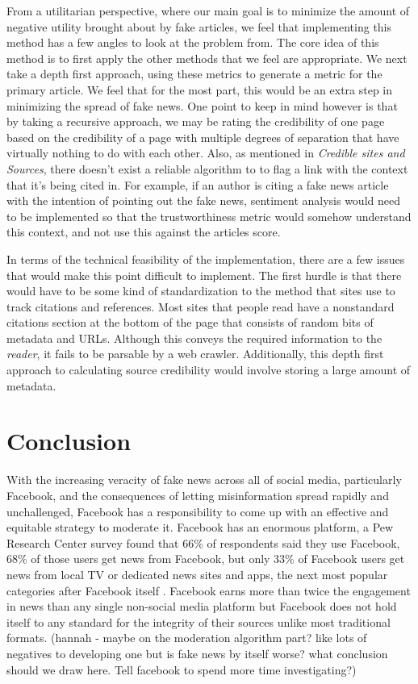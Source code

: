\documentclass[12pt]{article}
\begin{document}
From a utilitarian perspective, where our main goal is to minimize the amount of negative utility brought about by fake articles, we feel that implementing this method has a few angles to look at the problem from. The core idea of this method is to first apply the other methods that we feel are appropriate. We next take a depth first approach, using these metrics to generate a metric for the primary article. We feel that for the most part, this would be an extra step in minimizing the spread of fake news. One point to keep in mind however is that by taking a recursive approach, we may be rating the credibility of one page based on the credibility of a page with multiple degrees of separation that have virtually nothing to do with each other. Also, as mentioned in \textit{Credible sites and Sources}, there doesn't exist a reliable algorithm to to flag a link with the context that it's being cited in. For example, if an author is citing a fake news article with the intention of pointing out the fake news, sentiment analysis would need to be implemented so that the trustworthiness metric would somehow understand this context, and not use this against the articles score.

In terms of the technical feasibility of the implementation, there are a few issues that would make this point difficult to implement. The first hurdle is that there would have to be some kind of standardization to the method that sites use to track citations and references. Most sites that people read have a nonstandard citations section at the bottom of the page that consists of random bits of metadata and URLs. Although this conveys the required information to the \textit{reader}, it fails to be parsable by a web crawler. Additionally, this depth first approach to calculating source credibility would involve storing a large amount of metadata.

\section{Conclusion}

With the increasing veracity of fake news across all of social media, particularly Facebook, and the consequences of letting misinformation spread rapidly and unchallenged, Facebook has a responsibility to come up with an effective and equitable strategy to moderate it. Facebook has an enormous platform, a Pew Research Center survey found that 66\% of respondents said they use Facebook, 68\% of those users get news from Facebook, but only 33\% of Facebook users get news from local TV or dedicated news sites and apps, the next most popular categories after Facebook itself \citep{pew_news}. Facebook earns more than twice the engagement in news than any single non-social media platform but Facebook does not hold itself to any standard for the integrity of their sources unlike most traditional formats. (hannah - maybe on the moderation algorithm part? like lots of negatives to developing one but is fake news by itself worse? what conclusion should we draw here. Tell facebook to spend more time investigating?)
\end{document}
